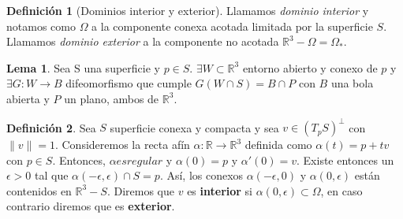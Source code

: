 \documentclass[paper=a4, fontsize=11pt, spanish]{scrartcl}
\newcommand{\rtres}{\mathbb{R}^3}
\theoremstyle{definition}
\newtheorem{lemma}[theorem]{Lema}
\theoremstyle{definition}
\newtheorem{definition}{Definición}
\theoremstyle{definition}
\begin{document}
\begin{definition}[Dominios interior y exterior]
Llamamos \textit{dominio interior} y notamos como $\Omega$ a la componente conexa acotada limitada por la superficie $S$. Llamamos \textit{dominio exterior} a la componente no acotada $\rtres - \Omega=\Omega_{*}$.
\end{definition}

\begin{lemma}
Sea S una superficie y $p \in S$. $\exists W \subset \rtres$ entorno abierto y conexo de $p$ y $\exists G: W \longrightarrow B$ difeomorfismo que cumple $G(W\cap S) = B\cap P$ con $B$ una bola abierta y $P$ un plano, ambos de $\rtres$.
\end{lemma}

\begin{definition}
Sea $S$ superficie conexa y compacta y sea $v \in (T_pS)^{\perp}$ con $\parallel v \parallel=1$. Consideremos la recta afín $\alpha: \mathbb{R} \longrightarrow \rtres$ definida como $\alpha(t) = p + tv$ con $p \in S$. Entonces, $\alpha es regular$ y $\alpha(0)=p$ y $\alpha'(0) = v$. Existe entonces un $\epsilon > 0$ tal que $\alpha(-\epsilon, \epsilon) \cap S = {p}$. Así, los conexos $\alpha(-\epsilon, 0)$ y $\alpha(0, \epsilon)$ están contenidos en $\rtres - S$. Diremos que $v$ es \textbf{interior} si $\alpha(0, \epsilon) \subset \Omega$, en caso contrario diremos que es \textbf{exterior}.
\end{definition}
\end{document}
